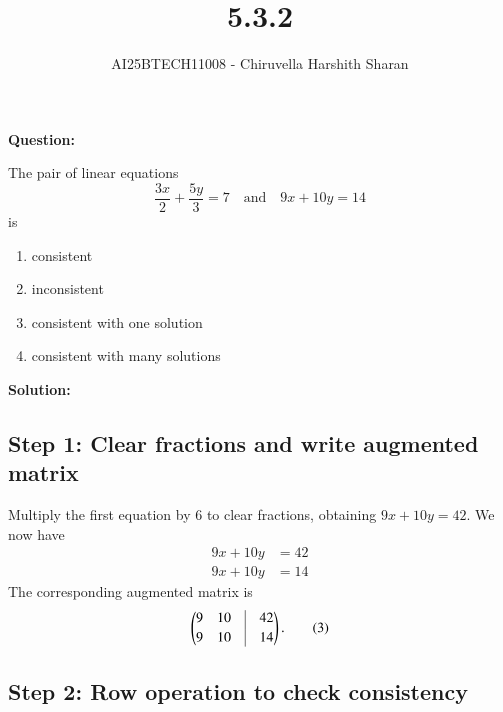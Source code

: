\documentclass[journal]{IEEEtran}
\begin{document}

\vspace{3cm}

\title{5.3.2}
\author{AI25BTECH11008 - Chiruvella Harshith Sharan}
{\let\newpage\relax\maketitle}

\setlength{\intextsep}{10pt} 

\textbf{Question:} \\

\vspace{0.3cm}

The pair of linear equations 
\[
\frac{3x}{2} + \frac{5y}{3} = 7 
\quad \text{and} \quad 
9x + 10y = 14
\]
is 

\begin{enumerate}[label=(\alph*)]
\item consistent 
\item inconsistent 
\item consistent with one solution 
\item consistent with many solutions
\end{enumerate}

\vspace{0.3cm}

\textbf{Solution:}

\subsection*{Step 1: Clear fractions and write augmented matrix}

Multiply the first equation by $6$ to clear fractions, obtaining $9x+10y=42$. We now have
\begin{align}
9x + 10y &= 42 \tag{1}\\
9x + 10y &= 14 \tag{2}
\end{align}
The corresponding augmented matrix is
\begin{align}
\begin{pmatrix}
9 & 10 & \vline & 42\\[2pt]
9 & 10 & \vline & 14
\end{pmatrix}. \tag{3}
\end{align}

\subsection*{Step 2: Row operation to check consistency}
\end{document}
